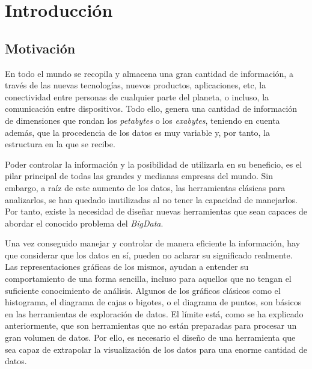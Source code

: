 \chapter{Introducción}

\section{Motivación}

En todo el mundo se recopila y almacena una gran cantidad de información, a través de las nuevas tecnologías, nuevos productos, aplicaciones, etc, la conectividad entre personas de cualquier parte del planeta, o incluso, la comunicación entre dispositivos. Todo ello, genera una cantidad de información de dimensiones que rondan los \textit{petabytes} o los \textit{exabytes}, teniendo en cuenta además, que la procedencia de los datos es muy variable y, por tanto, la estructura en la que se recibe. 

Poder controlar la información y la posibilidad de utilizarla en su beneficio, es el pilar principal de todas las grandes y medianas empresas del mundo. Sin embargo, a raíz de este aumento de los datos, las herramientas clásicas para analizarlos, se han quedado inutilizadas al no tener la capacidad de manejarlos. Por tanto, existe la necesidad de diseñar nuevas herramientas que sean capaces de abordar el conocido problema del \textit{BigData}. 

Una vez conseguido manejar y controlar de manera eficiente la información, hay que considerar que los datos en sí, pueden no aclarar su significado realmente. Las representaciones gráficas de los mismos, ayudan a entender su comportamiento de una forma sencilla, incluso para aquellos que no tengan el suficiente conocimiento de análisis. Algunos de los gráficos clásicos como el histograma, el diagrama de cajas o bigotes, o el diagrama de puntos, son básicos en las herramientas de exploración de datos. El límite está, como se ha explicado anteriormente, que son herramientas que no están preparadas para procesar un gran volumen de datos. Por ello, es necesario el diseño de una herramienta que sea capaz de extrapolar la visualización de los datos para una enorme cantidad de datos.

